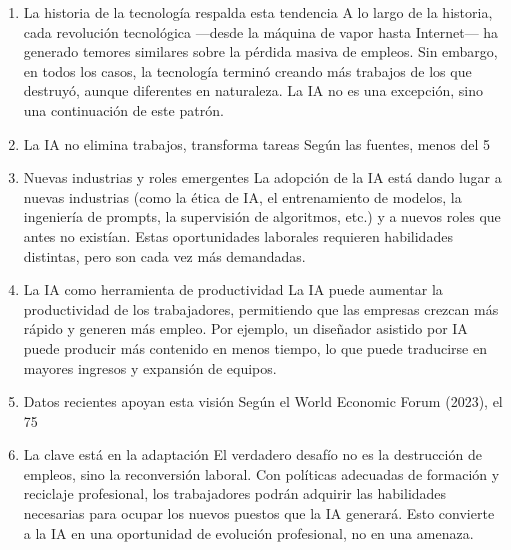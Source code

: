 \documentclass[12pt, a4paper, twoside]{article}
\begin{document}
\begin{enumerate}
\item La historia de la tecnología respalda esta tendencia
A lo largo de la historia, cada revolución tecnológica —desde la máquina de vapor hasta Internet— ha generado temores similares sobre la pérdida masiva de empleos. Sin embargo, en todos los casos, la tecnología terminó creando más trabajos de los que destruyó, aunque diferentes en naturaleza. La IA no es una excepción, sino una continuación de este patrón.

\item La IA no elimina trabajos, transforma tareas
Según las fuentes, menos del 5%

\item Nuevas industrias y roles emergentes
La adopción de la IA está dando lugar a nuevas industrias (como la ética de IA, el entrenamiento de modelos, la ingeniería de prompts, la supervisión de algoritmos, etc.) y a nuevos roles que antes no existían. Estas oportunidades laborales requieren habilidades distintas, pero son cada vez más demandadas.

\item La IA como herramienta de productividad
La IA puede aumentar la productividad de los trabajadores, permitiendo que las empresas crezcan más rápido y generen más empleo. Por ejemplo, un diseñador asistido por IA puede producir más contenido en menos tiempo, lo que puede traducirse en mayores ingresos y expansión de equipos.

\item Datos recientes apoyan esta visión
Según el World Economic Forum (2023), el 75%

\item La clave está en la adaptación
El verdadero desafío no es la destrucción de empleos, sino la reconversión laboral. Con políticas adecuadas de formación y reciclaje profesional, los trabajadores podrán adquirir las habilidades necesarias para ocupar los nuevos puestos que la IA generará. Esto convierte a la IA en una oportunidad de evolución profesional, no en una amenaza.

\end{enumerate}
\end{document}
